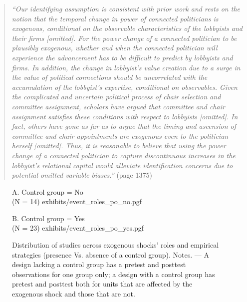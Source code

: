 \documentclass[11pt]{article}
\begin{document}
\begin{refsection}
\begin{quote}
  \textit{
    ``Our identifying assumption is consistent with prior work and rests on the
    notion that the temporal change in power of connected politicians is
    exogenous, conditional on the observable characteristics of the lobbyists
    and their firms [omitted]. For the power change of a connected politician to
    be plausibly exogenous, whether and when the connected politician will
    experience the advancement has to be difficult to predict by lobbyists and
    firms. In addition, the change in lobbyist's value creation due to a surge
    in the value of political connections should be uncorrelated with the
    accumulation of the lobbyist's expertise, conditional on observables. Given
    the complicated and uncertain political process of chair selection and
    committee assignment, scholars have argued that committee and chair
    assignment satisfies these conditions with respect to lobbyists [omitted].
    In fact, others have gone as far as to argue that the timing and ascension
    of committee and chair appointments are exogenous even to the politician
    herself [omitted]. Thus, it is reasonable to believe that using the power
    change of a connected politician to capture discontinuous increases in the
    lobbyist's relational capital would alleviate identification concerns due to
    potential omitted variable biases.''
  }
  (page 1375)
\end{quote}

\begin{figure}[!htbp]
  \raggedleft
  \begin{small}
    \begin{minipage}{0.48\textwidth}
      \centering
      A. Control group = No\\(N = 14)
      \vspace{1.2em}
      {exhibits/event_roles_po_no.pgf}
    \end{minipage}\hfill
    \begin{minipage}{0.48\textwidth}
      \centering
      B. Control group = Yes\\(N = 23)
      {exhibits/event_roles_po_yes.pgf}
    \end{minipage}
    \caption{
      Distribution of studies across exogenous shocks' roles and empirical strategies (presence Vs. absence of a control group). Notes. --- A design lacking a control group has a pretest and posttest observations for one group only; a design with a control group has pretest and posttest both for units that are affected by the exogenous shock and those that are not.
    }
    \label{fig:potential_outcome}
  \end{small}
\end{figure}


\end{refsection}
\end{document}
